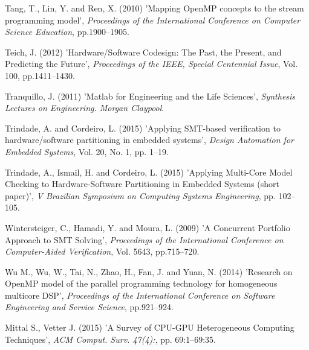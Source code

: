 \documentclass{doublecol-new}
\theoremstyle{TH}{
\newtheorem{lemma}{Lemma}
\newtheorem{theorem}[lemma]{Theorem}
\newtheorem{corrolary}[lemma]{Corrolary}
\newtheorem{conjecture}[lemma]{Conjecture}
\newtheorem{proposition}[lemma]{Proposition}
\newtheorem{claim}[lemma]{Claim}
\newtheorem{stheorem}[lemma]{Wrong Theorem}
\newtheorem{algorithm}{Algorithm}
}
\theoremstyle{THrm}{
\newtheorem{definition}{Definition}[section]
\newtheorem{question}{Question}[section]
\newtheorem{remark}{Remark}
\newtheorem{scheme}{Scheme}
}
\theoremstyle{THhit}{
\newtheorem{case}{Case}[section]
}
\begin{document}
\begin{thebibliography}{10}
Tang, T., Lin, Y. and Ren, X. (2010) 'Mapping OpenMP concepts to the stream programming model', {\it Proceedings of the International Conference on Computer Science Education}, pp.1900--1905.

Teich, J. (2012) 'Hardware/Software Codesign: The Past, the Present, and Predicting the Future', {\it Proceedings of the IEEE, Special Centennial Issue}, Vol. 100, pp.1411--1430.

Tranquillo, J. (2011) 'Matlab for Engineering and the Life Sciences', {\it Synthesis Lectures on Engineering. Morgan Claypool}.

Trindade, A. and Cordeiro, L. (2015) 'Applying SMT-based verification to hardware/software partitioning in embedded systems', {\it Design Automation for Embedded Systems}, Vol. 20, No. 1, pp. 1--19.

Trindade, A., Ismail, H. and Cordeiro, L. (2015) 'Applying Multi-Core Model Checking to Hardware-Software Partitioning in Embedded Systems (short paper)', {\it V Brazilian Symposium on Computing Systems Engineering}, pp. 102--105.

Wintersteiger, C., Hamadi, Y. and Moura, L. (2009) 'A Concurrent Portfolio Approach to SMT Solving', {\it Proceedings of the International Conference on Computer-Aided Verification}, Vol. 5643, pp.715--720.

Wu M., Wu, W., Tai, N., Zhao, H., Fan, J. and Yuan, N. (2014) 'Research on OpenMP model of the parallel programming technology for homogeneous multicore DSP', {\it Proceedings of the International Conference on Software Engineering and Service Science}, pp.921--924.

Mittal S., Vetter J. (2015) 'A Survey of CPU-GPU Heterogeneous Computing Techniques', {\it ACM Comput. Surv. 47(4):}, pp. 69:1--69:35.

\end{thebibliography}
\end{document}
